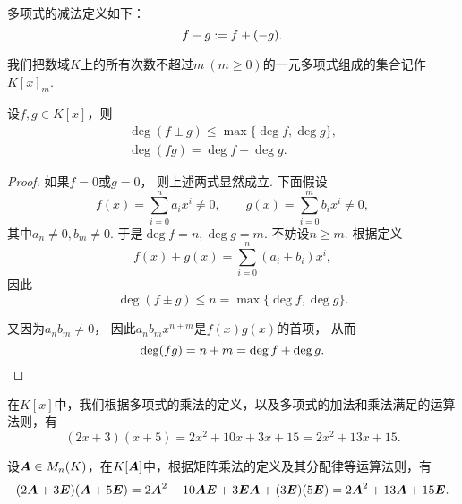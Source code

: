 多项式的减法定义如下：\begin{equation}
	f-g := f+(-g).
\end{equation}

我们把数域\(K\)上的所有次数不超过\(m\ (m\geq0)\)的一元多项式组成的集合记作\(K[x]_m\).

\begin{proposition}
设\(f,g \in K[x]\)，则\begin{gather}
	\deg(f \pm g) \leq \max\{\deg f, \deg g\},
	\label{equation:多项式.和的次数} \\
	\deg(fg) = \deg f + \deg g.
	\label{equation:多项式.积的次数}
\end{gather}
\begin{proof}
如果\(f=0\)或\(g=0\)，
则上述两式显然成立.
下面假设\begin{equation*}
	f(x)
	= \sum_{i=0}^n a_i x^i
	\neq0, \qquad
	g(x)
	= \sum_{i=0}^m b_i x^i
	\neq0,
\end{equation*}
其中\(a_n\neq0,b_m\neq0\).
于是\(\deg f=n,
\deg g=m\).
不妨设\(n \geq m\).
根据定义\begin{equation*}
	f(x) \pm g(x)
	= \sum_{i=0}^n (a_i \pm b_i) x^i,
\end{equation*}
因此\begin{equation*}
	\deg(f \pm g)
	\leq n
	= \max\{
		\deg f,
		\deg g
	\}.
\end{equation*}

又因为\(a_n b_m \neq 0\)，
因此\(a_n b_m x^{n+m}\)是\(f(x) g(x)\)的首项，
从而\begin{equation*}
	\deg(fg) = n+m = \deg f + \deg g.
	\qedhere
\end{equation*}
\end{proof}
\end{proposition}

在\(K[x]\)中，我们根据多项式的乘法的定义，以及多项式的加法和乘法满足的运算法则，有
\begin{equation}\label{equation:多项式.示例公式1}
	(2x+3)(x+5)
	=2x^2+10x+3x+15
	=2x^2+13x+15.
\end{equation}

设\(\boldsymbol{A} \in M_n(K)\)，在\(K[\boldsymbol{A}]\)中，根据矩阵乘法的定义及其分配律等运算法则，有
\begin{equation}\label{equation:多项式.示例公式2}
	(2\boldsymbol{A}+3\boldsymbol{E})(\boldsymbol{A}+5\boldsymbol{E})
	=2\boldsymbol{A}^2+10\boldsymbol{A}\boldsymbol{E}+3\boldsymbol{E}\boldsymbol{A}+(3\boldsymbol{E})(5\boldsymbol{E})
	=2\boldsymbol{A}^2+13\boldsymbol{A}+15\boldsymbol{E}.
\end{equation}

